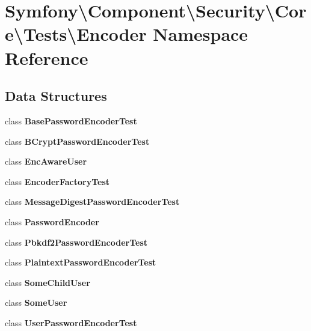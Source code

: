 \section{Symfony\textbackslash{}Component\textbackslash{}Security\textbackslash{}Core\textbackslash{}Tests\textbackslash{}Encoder Namespace Reference}
\label{namespace_symfony_1_1_component_1_1_security_1_1_core_1_1_tests_1_1_encoder}
\subsection*{Data Structures}
\begin{DoxyCompactItemize}
\item 
class {\bf Base\+Password\+Encoder\+Test}
\item 
class {\bf B\+Crypt\+Password\+Encoder\+Test}
\item 
class {\bf Enc\+Aware\+User}
\item 
class {\bf Encoder\+Factory\+Test}
\item 
class {\bf Message\+Digest\+Password\+Encoder\+Test}
\item 
class {\bf Password\+Encoder}
\item 
class {\bf Pbkdf2\+Password\+Encoder\+Test}
\item 
class {\bf Plaintext\+Password\+Encoder\+Test}
\item 
class {\bf Some\+Child\+User}
\item 
class {\bf Some\+User}
\item 
class {\bf User\+Password\+Encoder\+Test}
\end{DoxyCompactItemize}
